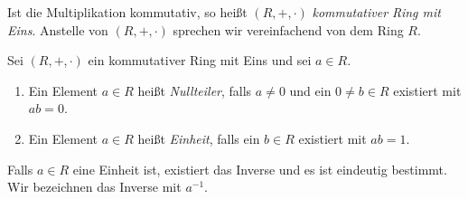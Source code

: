 \begin{bem} %
Ist die Multiplikation kommutativ, so heißt $\left(R, +, \cdot\right)$ \textit{kommutativer Ring mit Eins}. Anstelle von $\left(R, +, \cdot\right)$ sprechen wir vereinfachend von dem Ring $R$.
\end{bem}
%
\begin{defn}
Sei $\left(R, +, \cdot\right)$ ein kommutativer Ring mit Eins und sei $a \in R$.
\begin{enumerate}
\item Ein Element $a \in R$ heißt \textit{Nullteiler}, falls $a \neq 0$ und ein $0 \neq b \in R$ existiert mit $ab =0$.
\item Ein Element $a \in R$ heißt \textit{Einheit}, falls ein $b \in R$ existiert mit $ab = 1$. 
\end{enumerate}
\end{defn}
%
%
%
\begin{bem}
Falls $a\in R$ eine Einheit ist, existiert das Inverse und es ist eindeutig bestimmt. Wir bezeichnen das Inverse mit $a^{-1}$.
\end{bem}

